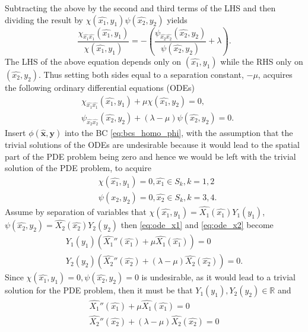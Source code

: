 \documentclass[\main/thesis.tex]{subfiles}
\begin{document}
Subtracting the above by the second and third terms of the LHS and then dividing 
the result by $\chi(\hat{x_1}, y_1) \psi(\hat{x_2}, y_2)$ yields
\begin{equation*}
	\frac{\chi_{\hat{x_1}\hat{x_1}}(\hat{x_1}, y_1)}
	     {\chi(\hat{x_1}, y_1)}
	{=} {-} \left(
	              \frac{\psi_{\hat{x_2}\hat{x_2}}(\hat{x_2}, y_2)}
	                   {\psi(\hat{x_2}, y_2)}
	          {+} \lambda
	        \right).
\end{equation*}
The LHS of the above equation depends only on $(\hat{x_1}, y_1)$ while the RHS only on $(\hat{x_2}, y_2)$. 
Thus setting both sides equal to a separation constant, $\minus \mu$, acquires 
the following ordinary differential equations (ODEs)
\begin{align}
	&\chi_{\hat{x_1}\hat{x_1}}(\hat{x_1}, y_1) {+} \mu \chi(\hat{x_1}, y_2) {=} 0,
	\label{eq:ode_x1_y1} \\
	&\psi_{\hat{x_2}\hat{x_2}}(\hat{x_2}, y_2) {+} (\lambda {-} \mu) \psi(\hat{x_2}, y_2) {=} 0.
	\label{eq:ode_x2_y2}
\end{align}
Insert $\phi(\boldsymbol{\hat{x}}, \boldsymbol{y})$ into the BC \eqref{eq:bcs_homo_phi}, 
with the assumption that the trivial solutions of the ODEs are undesirable because it would lead to the spatial part of the PDE problem being zero and hence we would be left with the trivial solution of the PDE problem, to acquire
\begin{align}
	&\chi(\hat{x_1}, y_1) {=} 0, \hat{x_1} {\in} S_k, k {=} 1, 2
	\label{eq:bc_ode_x1_y1} \\
	&\psi(\hat{x_2}, y_2) {=} 0, \hat{x_2} {\in} S_k, k {=} 3, 4.
	\label{eq:bc_ode_x2_y2}
\end{align}
Assume by separation of variables that $\chi(\hat{x_1}, y_1) {=} \hat{X_1}(\hat{x_1})Y_1(y_1)$,\newline
$\psi(\hat{x_2}, y_2) {=} \hat{X_2}(\hat{x_2})Y_2(y_2)$ then \eqref{eq:ode_x1} and \eqref{eq:ode_x2} become
\begin{align*}
    Y_1(y_1)(\hat{X_1}''(\hat{x_1}) {+} \mu \hat{X_1}(\hat{x_1})) {=} 0\\
    Y_2(y_2)(\hat{X_2}''(\hat{x_2}) {+} (\lambda - \mu) \hat{X_2}(\hat{x_2})) {=} 0.
\end{align*}
Since $\chi(\hat{x_1}, y_1) {=} 0, \psi(\hat{x_2}, y_2) {=} 0$ is undesirable, as it would lead to a trivial solution for the PDE problem, then it must be that $Y_1(y_1), Y_2(y_2) {\in} \mathbb{R}$ and
\begin{align}
    \hat{X_1}''(\hat{x_1}) {+} \mu \hat{X_1}(\hat{x_1}) {=} 0 \label{eq:ode_x1}\\
    \hat{X_2}''(\hat{x_2}) {+} (\lambda - \mu) \hat{X_2}(\hat{x_2}) {=} 0 \label{eq:ode_x2}
\end{align}
\end{document}
